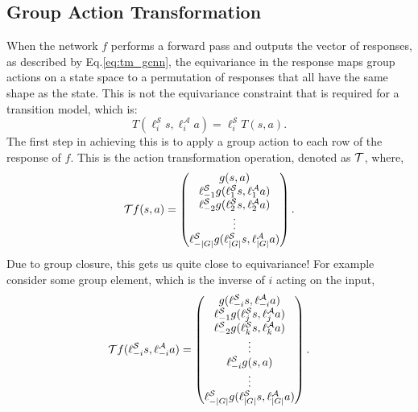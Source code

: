\subsection{Group Action Transformation}
When the network $f$ performs a forward pass and outputs the vector of responses, as described by Eq.\ref{eq:tm_gcnn}, the equivariance in the response maps group actions on a state space to a permutation of responses that all have the same shape as the state. This is not the equivariance constraint that is required for a transition model, which is:
\begin{equation}
	T(\ell_i^\mathcal{S}s, \ell_i^\mathcal{A}a) = \ell_i^\mathcal{S}T(s, a).
\end{equation}
The first step in achieving this is to apply a group action to each row of the response of $f$. This is the action transformation operation, denoted as $\mathbf{\mathcal{T}}$, where,
\begin{equation}
	\mathbf{\mathcal{T}}f(s,a) = \begin{pmatrix}
		g(s, a)                                                          \\
		\ell_{-1}^\mathcal{S}g(\ell_1^\mathcal{S}s,\ell^\mathcal{A}_1a)  \\
		\ell_{-2}^\mathcal{S}g(\ell^\mathcal{S}_2s, \ell^\mathcal{A}_2a) \\
		\vdots                                                           \\
		\ell_{-|G|}^\mathcal{S}g(\ell_{|G|}^\mathcal{S}s, \ell^\mathcal{A}_{|G|}a)
	\end{pmatrix}.
\end{equation}
Due to group closure, this gets us quite close to equivariance! For example consider some group element, which is the inverse of $i$ acting on the input,
\begin{equation}\label{eq:g-cnn}
	\mathbf{\mathcal{T}}f(\ell_{-i}^\mathcal{S}s,\ell_{-i}^\mathcal{A}a) = \begin{pmatrix}
		g(\ell_{-i}^\mathcal{S}s,\ell_{-i}^\mathcal{A}a)                 \\
		\ell_{-1}^\mathcal{S}g(\ell_j^\mathcal{S}s,\ell^\mathcal{A}_ja)  \\
		\ell_{-2}^\mathcal{S}g(\ell^\mathcal{S}_ks, \ell^\mathcal{A}_ka) \\
		\vdots                                                           \\
		\ell_{-i}^\mathcal{S}g(s, a)                                     \\
		\vdots                                                           \\
		\ell_{-|G|}^\mathcal{S}g(\ell_{|G|}^\mathcal{S}s, \ell^\mathcal{A}_{|G|}a)
	\end{pmatrix}.
\end{equation}

